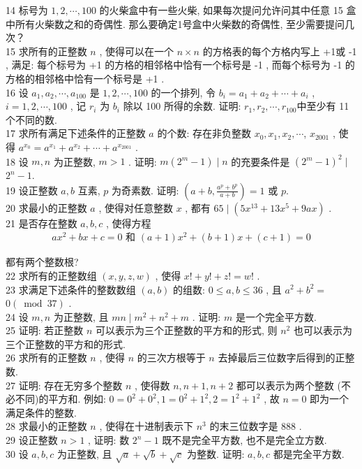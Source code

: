 14 标号为 $1,2, \cdots, 100$ 的火柴盒中有一些火柴, 如果每次提问允许问其中任意 15 盒中所有火柴数之和的奇偶性. 那么要确定1号盒中火柴数的奇偶性, 至少需要提问几次？\\
15 求所有的正整数 $n$ , 使得可以在一个 $n \times n$ 的方格表的每个方格内写上 +1或 -1 , 满足: 每个标号为 +1 的方格的相邻格中恰有一个标号是 -1 , 而每个标号为 -1 的方格的相邻格中恰有一个标号是 +1 . \\
16 设 $a_{1}, a_{2}, \cdots, a_{100}$ 是 $1,2, \cdots, 100$ 的一个排列, 令 $b_{i}=a_{1}+a_{2}+\cdots+a_{i}$ ,  $i=1,2, \cdots, 100$ , 记 $r_{i}$ 为 $b_{i}$ 除以 100 所得的余数. 证明: $r_{1}, r_{2}, \cdots, r_{100}$中至少有 11 个不同的数. \\
17 求所有满足下述条件的正整数 $a$ 的个数: 存在非负整数 $x_{0}, x_{1}, x_{2}, \cdots$, $x_{2001}$ , 使得 $a^{x_{0}}=a^{x_{1}}+a^{x_{2}}+\cdots+a^{x_{2001}}$ . \\
18 设 $m ,  n$ 为正整数,  $m>1$ . 证明:  $m\left(2^{m}-1\right) \mid n$ 的充要条件是 $\left(2^{m}-1\right)^{2} \mid$ $2^{n}-1$.\\
19 设正整数 $a ,  b$ 互素, $p$ 为奇素数. 证明: $\left(a+b, \frac{a^{p}+b^{p}}{a+b}\right)=1$ 或 $p$.\\
20 求最小的正整数 $a$ , 使得对任意整数 $x$ , 都有 $65 \mid\left(5 x^{13}+13 x^{5}+9 a x\right)$ . \\
21 是否存在整数 $a ,  b ,  c$ , 使得方程
\begin{align*}
	a x^{2}+b x+c=0 \text { 和 }(a+1) x^{2}+(b+1) x+(c+1)=0
\end{align*}

都有两个整数根?\\
22 求所有的正整数组 $(x, y, z, w)$ , 使得 $x!+y!+z!=w!$ . \\
23 求满足下述条件的整数数组 $(a, b)$ 的组数:  $0 \leqslant a, b \leqslant 36$ , 且 $a^{2}+b^{2}=$ $0(\bmod 37)$ . \\
24 设 $m ,  n$ 为正整数, 且 $m n \mid m^{2}+n^{2}+m$ . 证明:  $m$ 是一个完全平方数. \\
25 证明: 若正整数 $n$ 可以表示为三个正整数的平方和的形式, 则 $n^{2}$ 也可以表示为三个正整数的平方和的形式. \\
26 求所有的正整数 $n$ , 使得 $n$ 的三次方根等于 $n$ 去掉最后三位数字后得到的正整数.\\
27 证明: 存在无穷多个整数 $n$ , 使得数 $n ,  n+1 ,  n+2$ 都可以表示为两个整数 (不必不同)的平方和. 例如:  $0=0^{2}+0^{2}, 1=0^{2}+1^{2}, 2=1^{2}+1^{2}$ , 故 $n=0$ 即为一个满足条件的整数. \\
28 求最小的正整数 $n$ , 使得在十进制表示下 $n^{3}$ 的末三位数字是 888 . \\
29 设正整数 $n>1$ , 证明: 数 $2^{n}-1$ 既不是完全平方数, 也不是完全立方数. \\
30 设 $a ,  b ,  c$ 为正整数, 且 $\sqrt{a}+\sqrt{b}+\sqrt{c}$ 为整数. 证明:  $a ,  b ,  c$ 都是完全平方数.

